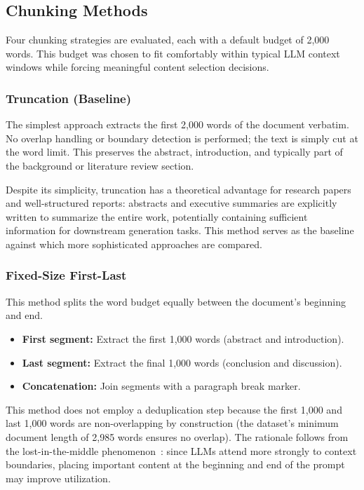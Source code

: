 \documentclass{ieeeaccess}
\begin{document}
\subsection{Chunking Methods}

Four chunking strategies are evaluated, each with a default budget of 2,000 words. This budget was chosen to fit comfortably within typical LLM context windows while forcing meaningful content selection decisions.

\subsubsection{Truncation (Baseline)}

The simplest approach extracts the first 2,000 words of the document verbatim. No overlap handling or boundary detection is performed; the text is simply cut at the word limit. This preserves the abstract, introduction, and typically part of the background or literature review section.

Despite its simplicity, truncation has a theoretical advantage for research papers and well-structured reports: abstracts and executive summaries are explicitly written to summarize the entire work, potentially containing sufficient information for downstream generation tasks. This method serves as the baseline against which more sophisticated approaches are compared.

\subsubsection{Fixed-Size First-Last}

This method splits the word budget equally between the document's beginning and end.
\begin{itemize}
    \item \textbf{First segment:} Extract the first 1,000 words (abstract and introduction).
    \item \textbf{Last segment:} Extract the final 1,000 words (conclusion and discussion).
    \item \textbf{Concatenation:} Join segments with a paragraph break marker.
\end{itemize}

This method does not employ a deduplication step because the first 1,000 and last 1,000 words are non-overlapping by construction (the dataset's minimum document length of 2,985 words ensures no overlap). The rationale follows from the lost-in-the-middle phenomenon~\cite{b1}: since LLMs attend more strongly to context boundaries, placing important content at the beginning and end of the prompt may improve utilization.
\end{document}
